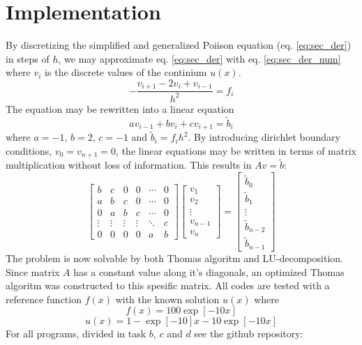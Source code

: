 \documentclass[twoside,twocolumn]{article}
\begin{document}
\section{Implementation}
By discretizing the simplified and generalized Poiison equation (eq. \ref{eq:sec_der}) in steps of $h$, we may approximate eq. \ref{eq:sec_der} with eq. \ref{eq:sec_der_num} where $v_i$ is the discrete values of the continium $u(x)$.
\begin{equation}
-\frac{v_{i+1}-2v_i+v_{i-1}}{h^2}=f_i \label{eq:sec_der_num}
\end{equation}
The equation may be rewritten into a linear equation
\begin{equation*}
av_{i-1}+bv_i+cv_{i+1}=\tilde{b}_i 
\end{equation*}
where $a=-1$, $b=2$, $c=-1$ and $\tilde{b}_i=f_ih^2$. By introducing dirichlet boundary conditions, $v_0=v_{n+1}=0$, the linear equations may be written in terms of matrix multiplication without loss of information. This results in $Av=\tilde{b}$:
\begin{equation}
\begin{bmatrix}
b&c&0&0&\cdots &0\\
a&b&c&0& \cdots & 0\\
0&a&b&c& \cdots & 0\\
\vdots&\vdots&\vdots&\vdots&\ddots&c\\
0&0&0&0&a&b
\end{bmatrix}
\begin{bmatrix}
v_1\\v_2\\\vdots\\v_{n-1}\\v_{n}
\end{bmatrix}=
\begin{bmatrix}
\tilde{b}_0\\\tilde{b}_1\\\vdots\\\tilde{b}_{n-2}\\\tilde{b}_{n-1}
\end{bmatrix} \label{eq:problem}
\end{equation}
The problem is now solvable by both Thomas algoritm and LU-decomposition. Since matrix $A$ has a constant value along it's diagonals, an optimized Thomas algoritm was constructed to this spesific matrix. All codes are tested with a reference function $f(x)$ with the known solution $u(x)$ where
\begin{equation*}
f(x)=100\exp[-10x]
\end{equation*}
\begin{equation*}
u(x)=1-\exp[-10]x-10\exp[-10x]
\end{equation*}
For all programs, divided in task $b$, $c$ and $d$ see the github repository: 
\end{document}
